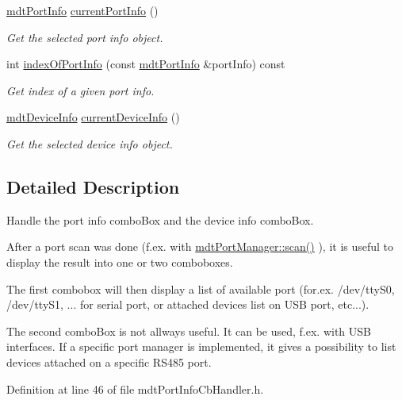 \begin{DoxyCompactItemize}
\hyperlink{classmdt_port_info}{mdt\-Port\-Info} \hyperlink{classmdt_port_info_cb_handler_a5723df72c4f1eda572c04e377dde9351}{current\-Port\-Info} ()
\begin{DoxyCompactList}\small\item\em Get the selected port info object. \end{DoxyCompactList}\item 
int \hyperlink{classmdt_port_info_cb_handler_ace2f9273d3f508507e496bdb2dc6d5c6}{index\-Of\-Port\-Info} (const \hyperlink{classmdt_port_info}{mdt\-Port\-Info} \&port\-Info) const 
\begin{DoxyCompactList}\small\item\em Get index of a given port info. \end{DoxyCompactList}\item 
\hyperlink{classmdt_device_info}{mdt\-Device\-Info} \hyperlink{classmdt_port_info_cb_handler_a266598f7f403e21730ff5ee50e6a6e5f}{current\-Device\-Info} ()
\begin{DoxyCompactList}\small\item\em Get the selected device info object. \end{DoxyCompactList}\end{DoxyCompactItemize}


\subsection{Detailed Description}
Handle the port info combo\-Box and the device info combo\-Box. 

After a port scan was done (f.\-ex. with \hyperlink{classmdt_port_manager_ad56afb411ab5468005fca04767557ece}{mdt\-Port\-Manager\-::scan()} ), it is useful to display the result into one or two comboboxes.

The first combobox will then display a list of available port (for.\-ex. /dev/tty\-S0, /dev/tty\-S1, ... for serial port, or attached devices list on U\-S\-B port, etc...).

The second combo\-Box is not allways useful. It can be used, f.\-ex. with U\-S\-B interfaces. If a specific port manager is implemented, it gives a possibility to list devices attached on a specific R\-S485 port. 

Definition at line 46 of file mdt\-Port\-Info\-Cb\-Handler.\-h.




